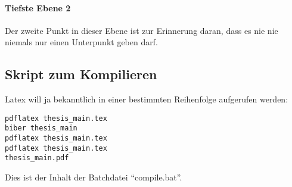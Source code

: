 \paragraph{Tiefste Ebene 2}
Der zweite Punkt in dieser Ebene ist zur Erinnerung daran, dass es nie nie niemals nur einen Unterpunkt geben darf.

\subsection{Skript zum Kompilieren}
Latex will ja bekanntlich in einer bestimmten Reihenfolge aufgerufen werden:
\begin{lstlisting}
pdflatex thesis_main.tex
biber thesis_main
pdflatex thesis_main.tex
pdflatex thesis_main.tex
thesis_main.pdf
\end{lstlisting}

Dies ist der Inhalt der Batchdatei \enquote{compile.bat}.
